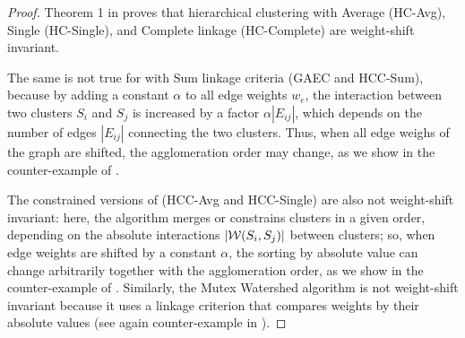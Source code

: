 \invariantAlgs*
\begin{proof}
Theorem 1 in \cite{chehreghani2020hierarchical} proves that hierarchical clustering with Average (HC-Avg), Single (HC-Single), and Complete linkage (HC-Complete) are weight-shift invariant.

The same is not true for \algname{} with Sum linkage criteria (GAEC and HCC-Sum), because by adding a constant $\alpha$ to all edge weights $w_e$, the interaction between two clusters $S_i$ and $S_j$ is increased by a factor $\alpha |E_{ij}|$, which depends on the number of edges  $|E_{ij}|$ connecting the two clusters. Thus, when all edge weighs of the graph are shifted, the agglomeration order may change, as we show in the counter-example of .


The constrained versions of \algname{} (HCC-Avg and HCC-Single) are also not weight-shift invariant: here, the algorithm merges or constrains clusters in a given order, depending on the absolute interactions $|\mathcal{W}{}(S_i, S_j)|$ between clusters; so, when edge weights are shifted by a constant $\alpha$, the sorting by absolute value can change arbitrarily together with the agglomeration order, as we show in the counter-example of .
Similarly, the Mutex Watershed algorithm is not weight-shift invariant because it uses a linkage criterion that compares weights by their absolute values (see again counter-example in ).
\end{proof}


